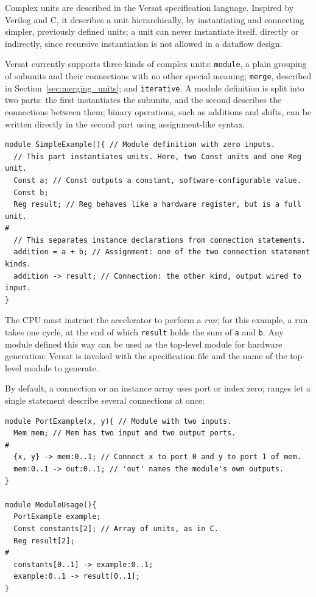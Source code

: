 %

Complex units are described in the Versat specification language. Inspired
by Verilog and C, it describes a unit hierarchically, by instantiating and
connecting simpler, previously defined units; a unit can never instantiate
itself, directly or indirectly, since recursive instantiation is not
allowed in a dataflow design.

Versat currently supports three kinds of complex units: \texttt{module}, a
plain grouping of subunits and their connections with no other special
meaning; \texttt{merge}, described in Section~\ref{sec:merging_units}; and
\texttt{iterative}. A module definition is split into two parts: the first
instantiates the subunits, and the second describes the connections between
them; binary operations, such as additions and shifts, can be written
directly in the second part using assignment-like syntax.

\begin{lstlisting}[language=VersatSpec,caption={A minimal Versat specification module.},label={lst:simple_example}]
module SimpleExample(){ // Module definition with zero inputs.
  // This part instantiates units. Here, two Const units and one Reg unit.
  Const a; // Const outputs a constant, software-configurable value.
  Const b;
  Reg result; // Reg behaves like a hardware register, but is a full unit.
#
  // This separates instance declarations from connection statements.
  addition = a + b; // Assignment: one of the two connection statement kinds.
  addition -> result; // Connection: the other kind, output wired to input.
}
\end{lstlisting}

The CPU must instruct the accelerator to perform a \emph{run}; for this
example, a run takes one cycle, at the end of which \texttt{result} holds
the sum of \texttt{a} and \texttt{b}. Any module defined this way can be
used as the top-level module for hardware generation: Versat is invoked
with the specification file and the name of the top-level module to
generate.

By default, a connection or an instance array uses port or index zero;
ranges let a single statement describe several connections at once:

\begin{lstlisting}[language=VersatSpec,caption={Ports, ranges, and instance arrays.},label={lst:port_example}]
module PortExample(x, y){ // Module with two inputs.
  Mem mem; // Mem has two input and two output ports.
#
  {x, y} -> mem:0..1; // Connect x to port 0 and y to port 1 of mem.
  mem:0..1 -> out:0..1; // 'out' names the module's own outputs.
}

module ModuleUsage(){
  PortExample example;
  Const constants[2]; // Array of units, as in C.
  Reg result[2];
#
  constants[0..1] -> example:0..1;
  example:0..1 -> result[0..1];
}
\end{lstlisting}
